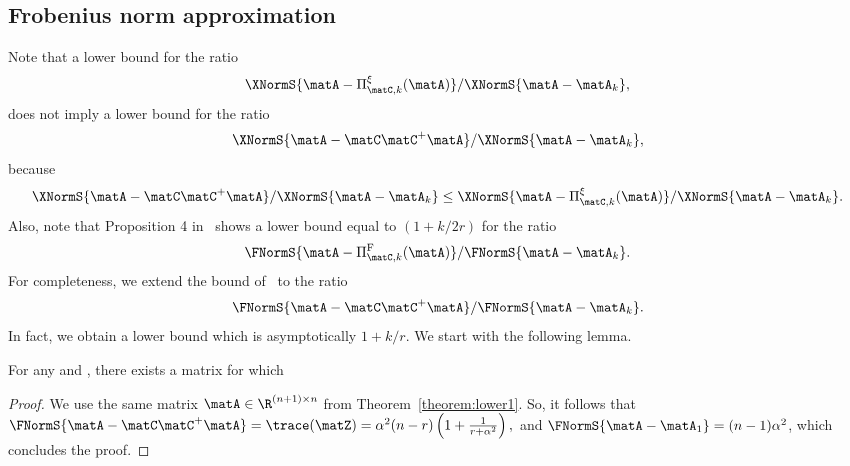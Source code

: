 \subsection{Frobenius norm approximation}\label{sec:lowerF}
\noindent Note that a lower bound for the ratio $$\XNormS{\matA-\Pi_{\matC,k}^{\xi}(\matA)}/\XNormS{\matA-\matA_k},$$
does not imply a lower bound for the ratio
$$\XNormS{\matA-\matC\matC^+\matA}/\XNormS{\matA-\matA_k},$$
because
$$ \XNormS{\matA-\matC\matC^+\matA}/\XNormS{\matA-\matA_k} \le \XNormS{\matA-\Pi_{\matC,k}^{\xi}(\matA)}/\XNormS{\matA-\matA_k}. $$
Also, note that Proposition 4 in~\cite{DV06}
shows a lower bound equal to $\left(1 + k/2r\right)$ for the ratio $$\FNormS{\matA-\Pi_{\matC,k}^{\mathrm{F}}(\matA)}/\FNormS{\matA-\matA_k}.$$
For completeness, we extend the bound of~\cite{DV06} to the ratio $$\FNormS{\matA-\matC\matC^+\matA}/\FNormS{\matA-\matA_k}.$$
In fact, we obtain a lower bound which is asymptotically $1 + k/r$.
We start with the following lemma.
\begin{lemma}\label{lemma:lowerF}
For any  and , there
exists a matrix  for which
\end{lemma}
\begin{proof}
We use the same matrix $\matA\in\R^{(n+1)\times n}$ from
Theorem~\ref{theorem:lower1}. So, it follows that
$\FNormS{\matA-\matC\matC^+\matA}=
\trace(\matZ)=\alpha^2(n-r)\left(1+\frac{1}{r+\alpha^2}\right),$
and $\FNormS{\matA-\matA_1}=(n-1)\alpha^2$, which concludes the proof.
\end{proof}

